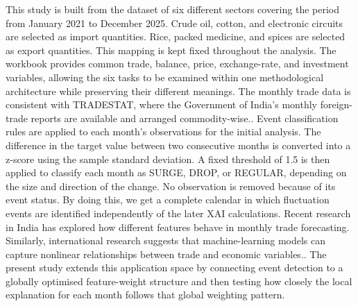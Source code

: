 \documentclass[pdftex,sn-mathphys-num]{sn-jnl}
\begin{document}
This study is built from the dataset of six different sectors covering the period from January 2021 to December 2025. Crude oil, cotton, and electronic circuits are selected as import quantities. Rice, packed medicine, and spices are selected as export quantities. This mapping is kept fixed throughout the analysis. The workbook provides common trade, balance, price, exchange-rate, and investment variables, allowing the six tasks to be examined within one methodological architecture while preserving their different meanings. The monthly trade data is consistent with TRADESTAT, where the Government of India's monthly foreign-trade reports are available and arranged commodity-wise.\cite{tradestat}. Event classification rules are applied to each month's observations for the initial analysis. The difference in the target value between two consecutive months is converted into a z-score using the sample standard deviation. A fixed threshold of 1.5 is then applied to classify each month as SURGE, DROP, or REGULAR, depending on the size and direction of the change. No observation is removed because of its event status. By doing this, we get a complete calendar in which fluctuation events are identified independently of the later XAI calculations. Recent research in India has explored how different features behave in monthly trade forecasting. Similarly, international research suggests that machine-learning models can capture nonlinear relationships between trade and economic variables.\cite{balasubramanian2026,josic2022,yang2023,chinn2023}. The present study extends this application space by connecting event detection to a globally optimised feature-weight structure and then testing how closely the local explanation for each month follows that global weighting pattern.
\end{document}
